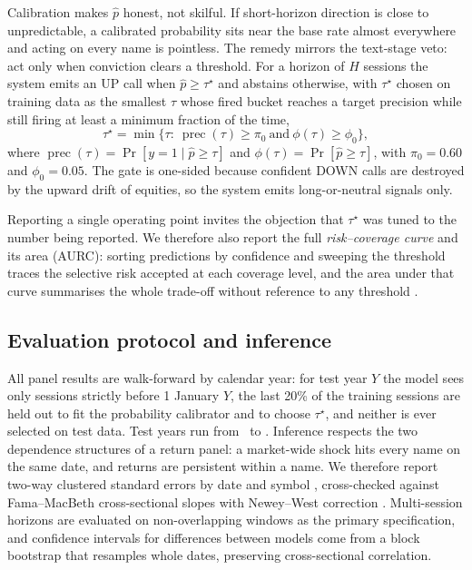 \documentclass[preprint,12pt,authoryear]{elsarticle}
\theoremstyle{plain}
\theoremstyle{remark}
\begin{document}
Calibration makes $\hat p$ honest, not skilful. If short-horizon direction is
close to unpredictable, a calibrated probability sits near the base rate almost
everywhere and acting on every name is pointless. The remedy mirrors the
text-stage veto: act only when conviction clears a threshold. For a horizon of
$H$ sessions the system emits an UP call when $\hat p\ge\tau^\star$ and abstains
otherwise, with $\tau^\star$ chosen on training data as the smallest $\tau$
whose fired bucket reaches a target precision while still firing at least a
minimum fraction of the time,
\begin{equation}\label{eq:tau}
\tau^\star=\min\bigl\{\tau:\ \operatorname{prec}(\tau)\ge \pi_0
\ \text{and}\ \phi(\tau)\ge\phi_0\bigr\},
\end{equation}
where $\operatorname{prec}(\tau)=\Pr[y=1\mid\hat p\ge\tau]$ and
$\phi(\tau)=\Pr[\hat p\ge\tau]$, with $\pi_0=0.60$ and $\phi_0=0.05$. The gate
is one-sided because confident DOWN calls are destroyed by the upward drift of
equities, so the system emits long-or-neutral signals only.

Reporting a single operating point invites the objection that $\tau^\star$ was
tuned to the number being reported. We therefore also report the full
\emph{risk--coverage curve} and its area (AURC): sorting predictions by
confidence and sweeping the threshold traces the selective risk accepted at each
coverage level, and the area under that curve summarises the whole trade-off
without reference to any threshold \citep{elyaniv2010,geifman2017}.

\subsection{Evaluation protocol and inference}\label{sec:inference}

All panel results are walk-forward by calendar year: for test year $Y$ the model
sees only sessions strictly before 1 January $Y$, the last 20\% of the training
sessions are held out to fit the probability calibrator and to choose
$\tau^\star$, and neither is ever selected on test data. Test years run from
\GateYearFirst\ to \GateYearLast. Inference respects the two dependence
structures of a return panel: a market-wide shock hits every name on the same
date, and returns are persistent within a name. We therefore report two-way
clustered standard errors by date and symbol \citep{cameron2011}, cross-checked
against Fama--MacBeth cross-sectional slopes with Newey--West correction
\citep{famamacbeth1973,neweywest1987}. Multi-session horizons are evaluated on
non-overlapping windows as the primary specification, and confidence intervals
for differences between models come from a block bootstrap that resamples whole
dates, preserving cross-sectional correlation.
\end{document}

